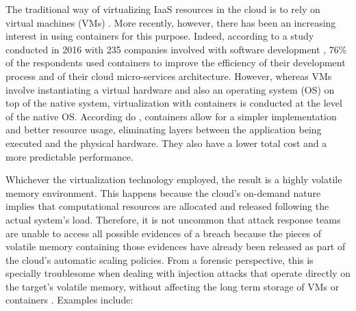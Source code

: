 \documentclass[twocolumn, notitlepage]{bmcart}%
\begin{document}
The traditional way of virtualizing IaaS resources in the cloud is to rely on virtual machines (VMs) \cite{Diamanti:2018}.
%
More recently, however, there has been an increasing interest in using containers for this purpose.
%
Indeed, according to a study conducted in 2016 with 235 companies involved with software development \cite{container-survey:2016}, 76\% of the respondents used containers to improve the efficiency of their development process and of their cloud micro-services architecture.
%
However, whereas VMs involve instantiating a virtual hardware and also an operating system (OS) on top of the native system, virtualization with containers is conducted at the level of the native OS.
%
According do \cite{Diamanti:2018}, containers allow for a simpler implementation and better resource usage, eliminating layers between the application being executed and the physical hardware.
%
They also have a lower total cost and a more predictable performance.


Whichever the virtualization technology employed, the result is a highly volatile memory environment.
%
This happens because the cloud's on-demand nature implies that computational resources are allocated and released following the actual system's load.
%
Therefore, it is not uncommon that attack response teams are unable to access all possible evidences of a breach because the pieces of volatile memory containing those evidences have already been released as part of the cloud's automatic scaling policies.
%
From a forensic perspective, this is specially troublesome when dealing with injection attacks that operate directly on the target's volatile memory, without affecting the long term storage of VMs or containers \cite{Case_Memory_Forensics:2014}. 
%
Examples include:
\end{document}
